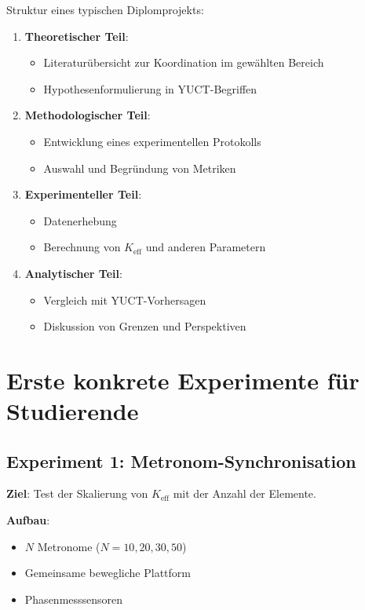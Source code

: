 \documentclass[12pt,a4paper]{article}
\begin{document}
	Struktur eines typischen Diplomprojekts:
	\begin{enumerate}
		\item \textbf{Theoretischer Teil}:
		\begin{itemize}
			\item Literaturübersicht zur Koordination im gewählten Bereich
			\item Hypothesenformulierung in YUCT-Begriffen
		\end{itemize}
		
		\item \textbf{Methodologischer Teil}:
		\begin{itemize}
			\item Entwicklung eines experimentellen Protokolls
			\item Auswahl und Begründung von Metriken
		\end{itemize}
		
		\item \textbf{Experimenteller Teil}:
		\begin{itemize}
			\item Datenerhebung
			\item Berechnung von $K_{\mathrm{eff}}$ und anderen Parametern
		\end{itemize}
		
		\item \textbf{Analytischer Teil}:
		\begin{itemize}
			\item Vergleich mit YUCT-Vorhersagen
			\item Diskussion von Grenzen und Perspektiven
		\end{itemize}
	\end{enumerate}
	
	\section{Erste konkrete Experimente für Studierende}
	
	\subsection{Experiment 1: Metronom-Synchronisation}
	
	\textbf{Ziel}: Test der Skalierung von $K_{\mathrm{eff}}$ mit der Anzahl der Elemente.
	
	\textbf{Aufbau}:
	\begin{itemize}
		\item $N$ Metronome ($N = 10, 20, 30, 50$)
		\item Gemeinsame bewegliche Plattform
		\item Phasenmesssensoren
	\end{itemize}
	
\end{document}

